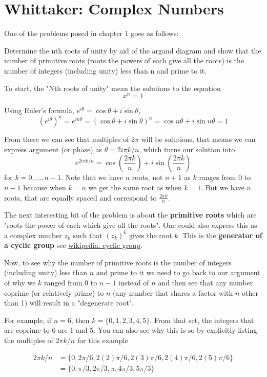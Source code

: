 \section{Whittaker: Complex Numbers}

One of the problems posed in chapter 1 goes as follows:

Determine the nth roots of unity by aid of the argand diagram and show that the number of primitive roots
(roots the powers of each give all the roots) is the number of integers (including unity) less than n and prime to it.

To start, the "Nth roots of unity" mean the solutions to the equation
$$
x^n = 1
$$

Using Euler's formula, $e^{i\theta} = \cos\theta + i\sin\theta$,
$$
\left( e^{i\theta} \right)^n = e^{in\theta} =
\left( \cos\theta + i\sin\theta \right)^n = 
\cos n\theta + i\sin n\theta = 1
$$

From there we can see that multiples of $2\pi$ will be solutions, that means
we can express argument (or phase) as $\theta = 2i\pi k /n$, which turns our solution into
$$
e^{2i\pi k /n} = \cos \left(\frac{2\pi k}{n}\right) + i\sin \left(\frac{2\pi k}{n}\right)
$$
for $k = 0, \dots, n-1$.
Note that we have $n$ roots, not $n+1$ as $k$ ranges from 0 to $n-1$ because when $k=n$ we get the same root as when $k=1$.
But we have $n$ roots, that are equally spaced and correspond to $\frac{2\pi k}{n}$.

The next interesting bit of the problem is about the \textbf{primitive roots} which are
"roots the power of each which give all the roots".
One could also express this as a complex number $z_{k}$ such that $(z_k)^k$ gives the root $k$.
This is the \textbf{generator of a cyclic group} see
\href{https://en.wikipedia.org/wiki/Cyclic_group}{wikipedia: cyclic group}.

Now, to see why the number of primitive roots is the number of integers (including unity) less than $n$ and prime to it
we need to go back to our argument of why we $k$ ranged from 0 to $n-1$ instead of $n$ and then see that any number
coprime (or relatively prime) to $n$ (any number that shares a factor with $n$ other than 1) will result in a "degenerate root".

For example, if $n=6$, then $k = \{ 0, 1, 2, 3, 4, 5 \}$.
From that set, the integers that are coprime to 6 are 1 and 5.
You can also see why this is so by explicitly listing the multiples of $2\pi k / n$ for this example

\begin{align*}
2\pi k / n &= \{ 0, 2\pi/6, 2(2)\pi/6, 2(3)\pi/6, 2(4)\pi/6, 2(5)\pi/6 \} \\
&= \{ 0, \pi/3, 2\pi/3, \pi, 4\pi/3, 5\pi/3 \}
\end{align*}